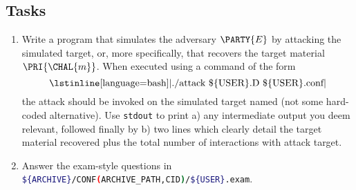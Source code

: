 \documentclass[crop={false},multi={true},tikz={true}]{standalone}
\begin{document}
\subsection{Tasks}

\begin{enumerate}
\item Write a program that simulates the adversary $\PARTY{E}$ by attacking
      the simulated target, or, more specifically, that recovers the target 
      material $\PRI{\CHAL{m}}$.  
      When executed using a command of the form
      \[
      \mbox{\lstinline[language={bash}]|./attack \$\{USER\}.D \$\{USER\}.conf|}
      \]
      the attack should be invoked on the simulated target named (not some
      hard-coded alternative).  Use \lstinline[language={bash}]{stdout} to 
      print 
      a) any intermediate output you deem relevant, followed finally by 
      b) two lines which clearly detail the target material recovered plus
         the total number of interactions with attack target.
\item Answer the exam-style questions in 
      \lstinline[language={bash}]|${ARCHIVE}/CONF(ARCHIVE_PATH,CID)/${USER}.exam|.
\end{enumerate}


\ifstandalone
\printbibliography
\fi
\end{document}
